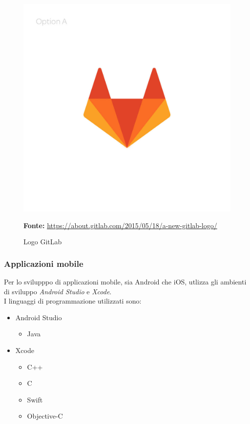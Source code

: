 \begin{figure}[H]
	\begin{center}
	\includegraphics[scale=0.15]{immagini/gitlab.jpg}
	\caption{Logo GitLab}
	\small{\textbf{Fonte:} \url{https://about.gitlab.com/2015/05/18/a-new-gitlab-logo/}}
	\end{center}
\end{figure}

\subsubsection{Applicazioni mobile}
Per lo svilupppo di applicazioni mobile, sia Android che iOS, \lab{} utlizza gli ambienti di sviluppo \textit{Android Studio} e \textit{Xcode}.
\\I linguaggi di programmazione utilizzati sono:
\begin{itemize}
\item Android Studio
	\begin{itemize}
		\item Java
	\end{itemize}
\item Xcode
	\begin{itemize}
		\item C++
		\item C
		\item Swift
		\item Objective-C
	\end{itemize}
\end{itemize}

